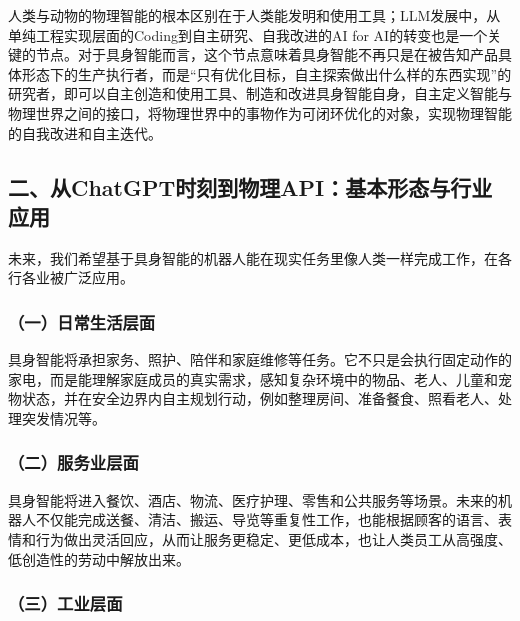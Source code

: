 人类与动物的物理智能的根本区别在于人类能发明和使用工具；LLM发展中，从单纯工程实现层面的Coding到自主研究、自我改进的AI for AI的转变也是一个关键的节点。对于具身智能而言，这个节点意味着具身智能不再只是在被告知产品具体形态下的生产执行者，而是``只有优化目标，自主探索做出什么样的东西实现''的研究者，即可以自主创造和使用工具、制造和改进具身智能自身，自主定义智能与物理世界之间的接口，将物理世界中的事物作为可闭环优化的对象，实现物理智能的自我改进和自主迭代。

\hypertarget{ux4e8cux4ecechatgptux65f6ux523bux5230ux7269ux7406apiux57faux672cux5f62ux6001ux4e0eux884cux4e1aux5e94ux7528}{%
\subsection{二、从ChatGPT时刻到物理API：基本形态与行业应用}\label{ux4e8cux4ecechatgptux65f6ux523bux5230ux7269ux7406apiux57faux672cux5f62ux6001ux4e0eux884cux4e1aux5e94ux7528}}

未来，我们希望基于具身智能的机器人能在现实任务里像人类一样完成工作，在各行各业被广泛应用。

\hypertarget{ux4e00ux65e5ux5e38ux751fux6d3bux5c42ux9762}{%
\subsubsection{（一）日常生活层面}\label{ux4e00ux65e5ux5e38ux751fux6d3bux5c42ux9762}}

具身智能将承担家务、照护、陪伴和家庭维修等任务。它不只是会执行固定动作的家电，而是能理解家庭成员的真实需求，感知复杂环境中的物品、老人、儿童和宠物状态，并在安全边界内自主规划行动，例如整理房间、准备餐食、照看老人、处理突发情况等。

\hypertarget{ux4e8cux670dux52a1ux4e1aux5c42ux9762}{%
\subsubsection{（二）服务业层面}\label{ux4e8cux670dux52a1ux4e1aux5c42ux9762}}

具身智能将进入餐饮、酒店、物流、医疗护理、零售和公共服务等场景。未来的机器人不仅能完成送餐、清洁、搬运、导览等重复性工作，也能根据顾客的语言、表情和行为做出灵活回应，从而让服务更稳定、更低成本，也让人类员工从高强度、低创造性的劳动中解放出来。

\hypertarget{ux4e09ux5de5ux4e1aux5c42ux9762}{%
\subsubsection{（三）工业层面}\label{ux4e09ux5de5ux4e1aux5c42ux9762}}

